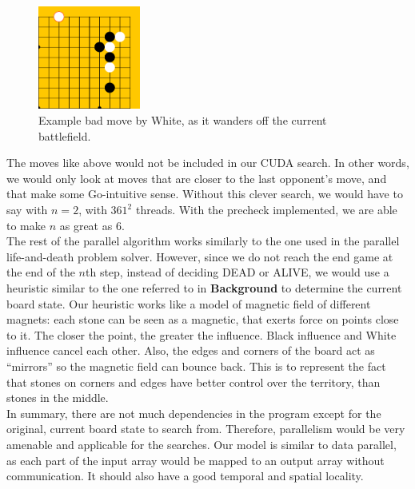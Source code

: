 \documentclass[11pt]{article}
\begin{document}
\begin{figure}[H]
    \centering
    \includegraphics[width=0.3\textwidth]{bad_2.png}
    \caption{Example bad move by White, as it wanders off the current battlefield.}
\end{figure}
The moves like above would not be included in our CUDA search. In other words, we would only look at moves that are closer to the last opponent's move, and that make some Go-intuitive sense.  Without this clever search, we would have to say with $n = 2$, with $361^2$ threads. With the precheck implemented, we are able to make $n$ as great as 6. \\
The rest of the parallel algorithm works similarly to the one used in the parallel life-and-death problem solver. However, since we do not reach the end game at the end of the $n$th step, instead of deciding DEAD or ALIVE, we would use a heuristic similar to the one referred to in \textbf{Background} to determine the current board state. Our heuristic works like a model of magnetic field of different magnets: each stone can be seen as a magnetic, that exerts force on points close to it. The closer the point, the greater the influence. Black influence and White influence cancel each other. Also, the edges and corners of the board act as ``mirrors'' so the magnetic field can bounce back. This is to represent the fact that stones on corners and edges have better control over the territory, than stones in the middle. \\
In summary, there are not much dependencies in the program except for the original, current board state to search from. Therefore, parallelism would be very amenable and applicable for the searches. Our model is similar to data parallel, as each part of the input array would be mapped to an output array without communication. It should also have a good temporal and spatial locality.
\end{document}
